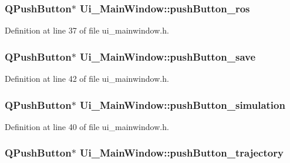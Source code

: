 \subsubsection[{\texorpdfstring{push\+Button\+\_\+ros}{pushButton_ros}}]{\setlength{\rightskip}{0pt plus 5cm}Q\+Push\+Button$\ast$ Ui\+\_\+\+Main\+Window\+::push\+Button\+\_\+ros}\hypertarget{class_ui___main_window_a2667c2b4f9c61bf9895b73d07d4b5172}{}\label{class_ui___main_window_a2667c2b4f9c61bf9895b73d07d4b5172}


Definition at line 37 of file ui\+\_\+mainwindow.\+h.

\subsubsection[{\texorpdfstring{push\+Button\+\_\+save}{pushButton_save}}]{\setlength{\rightskip}{0pt plus 5cm}Q\+Push\+Button$\ast$ Ui\+\_\+\+Main\+Window\+::push\+Button\+\_\+save}\hypertarget{class_ui___main_window_a257d4df0fe652a526e4fddba93c7a7d8}{}\label{class_ui___main_window_a257d4df0fe652a526e4fddba93c7a7d8}


Definition at line 42 of file ui\+\_\+mainwindow.\+h.

\subsubsection[{\texorpdfstring{push\+Button\+\_\+simulation}{pushButton_simulation}}]{\setlength{\rightskip}{0pt plus 5cm}Q\+Push\+Button$\ast$ Ui\+\_\+\+Main\+Window\+::push\+Button\+\_\+simulation}\hypertarget{class_ui___main_window_afd109ead0ad1ae7ae67ad1df803c9c38}{}\label{class_ui___main_window_afd109ead0ad1ae7ae67ad1df803c9c38}


Definition at line 40 of file ui\+\_\+mainwindow.\+h.

\subsubsection[{\texorpdfstring{push\+Button\+\_\+trajectory}{pushButton_trajectory}}]{\setlength{\rightskip}{0pt plus 5cm}Q\+Push\+Button$\ast$ Ui\+\_\+\+Main\+Window\+::push\+Button\+\_\+trajectory}\hypertarget{class_ui___main_window_a9d644554288462450d209192c1998095}{}\label{class_ui___main_window_a9d644554288462450d209192c1998095}


